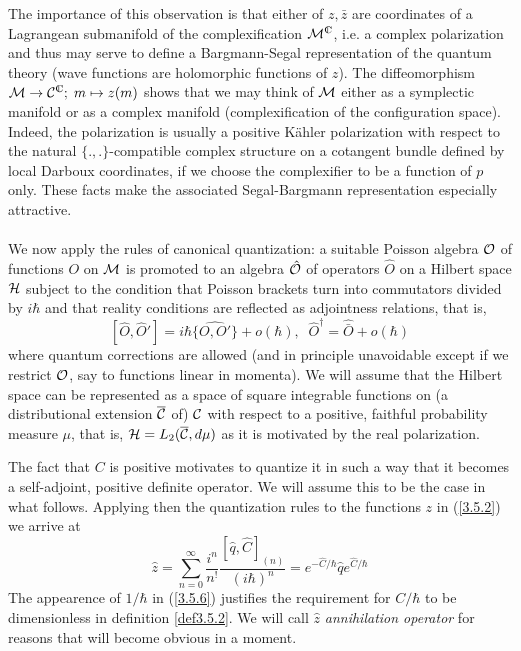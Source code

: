 \documentclass[12pt]{report}
\def\be{\begin{equation}}
\def\ee{\end{equation}}
\def\Cl{{\mathchoice
{\setbox0=\hbox{$\displaystyle\rm C$}\hbox{\hbox to0pt
{\kern0.4\wd0\vrule height0.9\ht0\hss}\box0}}
{\setbox0=\hbox{$\textstyle\rm C$}\hbox{\hbox to0pt
{\kern0.4\wd0\vrule height0.9\ht0\hss}\box0}}
{\setbox0=\hbox{$\scriptstyle\rm C$}\hbox{\hbox to0pt
{\kern0.4\wd0\vrule height0.9\ht0\hss}\box0}}
{\setbox0=\hbox{$\scriptscriptstyle\rm C$}\hbox{\hbox to0pt
{\kern0.4\wd0\vrule height0.9\ht0\hss}\box0}}}}
\begin{document}
The importance of 
this observation is that either of $z,\bar{z}$ are coordinates of a 
Lagrangean submanifold of the complexification ${\cal M}^\Cl$, i.e. a 
complex polarization and thus 
may serve to define a Bargmann-Segal representation of the quantum theory
(wave functions are holomorphic functions of $z$). The diffeomorphism 
${\cal M}\to {\cal C}^\Cl;\;m\mapsto z(m)$ shows that we may think of 
$\cal M$ either as a symplectic manifold or as a complex manifold 
(complexification of the configuration space). Indeed, the 
polarization is usually a positive K\"ahler polarization with respect
to the natural $\{.,.\}$-compatible complex structure on a cotangent 
bundle 
defined by local Darboux coordinates, if we choose the complexifier to be 
a function of $p$ only.  These facts make the associated Segal-Bargmann 
representation especially attractive.\\
\\
We now apply the rules of canonical quantization: a suitable 
Poisson algebra $\cal O$ of functions $O$ on $\cal M$
is promoted to an algebra $\hat{{\cal O}}$ of operators $\hat{O}$ on a 
Hilbert 
space $\cal H$ subject to the condition that Poisson brackets turn
into commutators divided by $i\hbar$ and that reality conditions 
are reflected as adjointness relations, that is,
\be \label{3.5.5}
[\hat{O},\hat{O}']=i\hbar \widehat{\{O,O'\}}+o(\hbar),\;\;
\hat{O}^\dagger=\hat{\bar{O}}+o(\hbar)
\ee
where quantum corrections are allowed (and in principle unavoidable 
except if we restrict $\cal O$, say to functions linear in momenta).
We will assume that the Hilbert space can be represented as a space of 
square integrable 
functions on (a distributional extension $\overline{{\cal C}}$ of) 
$\cal C$ with respect to a positive, faithful probability measure
$\mu$, that is, ${\cal H}=L_2(\overline{{\cal C}},d\mu)$ as it is 
motivated by the real polarization.   

The fact that $C$ is positive motivates to quantize it in such a way 
that it becomes a self-adjoint, positive definite operator. We will assume 
this to 
be the case in what follows.
Applying then the quantization rules to the functions $z$ in 
(\ref{3.5.2}) 
we arrive at
\be \label{3.5.6}
\hat{z}=\sum_{n=0}^\infty \frac{i^n}{n^!} 
\frac{[\hat{q},\hat{C}]_{(n)}}{(i\hbar)^n}=e^{-\hat{C}/\hbar}\hat{q}
e^{\hat{C}/\hbar}
\ee
The appearence of $1/\hbar$ in (\ref{3.5.6}) justifies the requirement
for $C/\hbar$ to be dimensionless in definition \ref{def3.5.2}.
We will call $\hat{z}$ {\it annihilation operator} for reasons that
will become obvious in a moment. 
\end{document}
